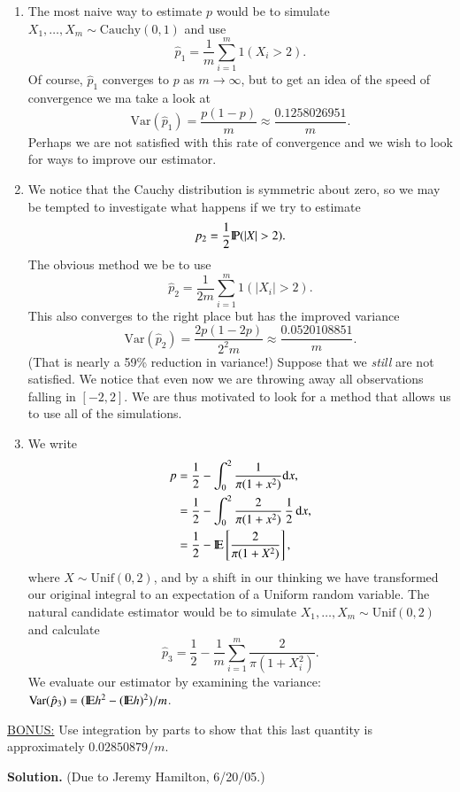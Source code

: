 \documentclass[captions=tableheading]{scrbook}
\begin{document}
\begin{enumerate}
\item The most naive way to estimate $p$ would be to simulate $X_{1},\ldots,X_{m} \sim \mathrm{Cauchy}(0,1)$ and use 
   \[
   \hat{p}_{1}=\frac{1}{m}\sum_{i=1}^{m}1(X_{i}>2).
   \]
   Of course, $\hat{p}_{1}$ converges to $p$ as $m\to\infty$, but to get an idea of the speed of convergence we ma take a look at 
   \[
   \mbox{Var}(\hat{p}_{1})=\frac{p(1-p)}{m}\approx\frac{0.1258026951}{m}.
   \]
   Perhaps we are not satisfied with this rate of convergence and we wish to look for ways to improve our estimator.
\item We notice that the Cauchy distribution is symmetric about zero, so we may be tempted to investigate what happens if we try to estimate
   \[
   p_{2}=\frac{1}{2}\P(|X|>2).
   \]
   The obvious method we be to use 
   \[
   \hat{p}_{2}=\frac{1}{2m}\sum_{i=1}^{m}1(|X_{i}|>2).
   \]
   This also converges to the right place but has the improved variance
   \[
   \mbox{Var}(\hat{p}_{2})=\frac{2p(1-2p)}{2^{2}m}\approx\frac{0.0520108851}{m}.
   \]
   (That is nearly a 59\% reduction in variance!) Suppose that we \emph{still} are not satisfied. We notice that even now we are throwing away all observations falling in $[-2,2]$. We are thus motivated to look for a method that allows us to use all of the simulations.
\item We write 
   \begin{align*}
   p & =\frac{1}{2}-\int_{0}^{2}\frac{1}{\pi(1+x^{2})}\mathrm{d} x,\\
   & =\frac{1}{2}-\int_{0}^{2}\frac{2}{\pi(1+x^{2})}\,\frac{1}{2}\,\mathrm{d} x,\\
   & =\frac{1}{2}-\mathrm{I\hspace{-1.5pt}E}\left[\frac{2}{\pi(1+X^{2})}\right],
   \end{align*}
   where $X\sim\mathrm{Unif}(0,2)$, and by a shift in our thinking we have transformed our original integral to an expectation of a Uniform random variable. The natural candidate estimator would be to simulate $X_{1},\ldots,X_{m}\sim\mathrm{Unif}(0,2)$ and calculate
   \[
   \hat{p}_{3}=\frac{1}{2}-\frac{1}{m}\sum_{i=1}^{m}\frac{2}{\pi(1+X_{i}^{2})}.
   \]
   We evaluate our estimator by examining the variance: $\mbox{Var}(\hat{p}_{3})=(\mathrm{I\hspace{-1.5pt}E} h^{2}-(\mathrm{I\hspace{-1.5pt}E} h)^{2})/m$.
\end{enumerate}

\underline{BONUS:} Use integration by parts to show that this last quantity is approximately $0.02850879/m$.

\textbf{Solution.} (Due to Jeremy Hamilton, 6/20/05.)
\end{document}
